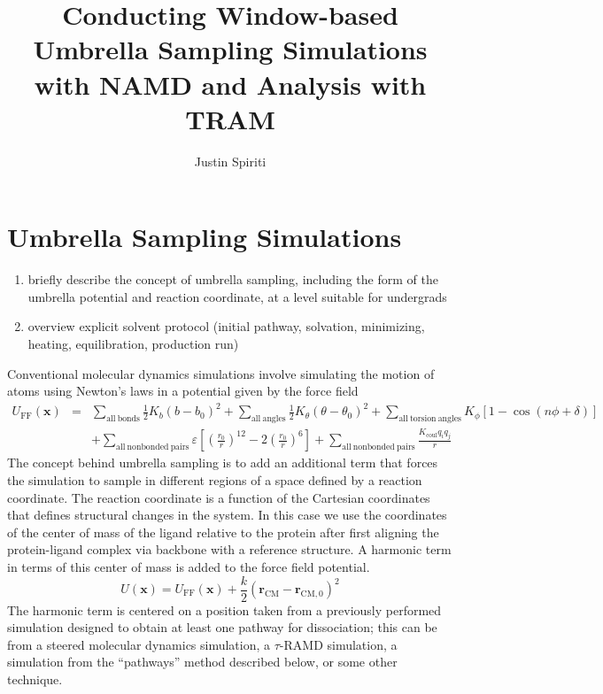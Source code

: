 \documentclass{article}      %
\title{Conducting Window-based Umbrella Sampling Simulations with NAMD and Analysis with TRAM}  %
\author{Justin Spiriti}      %
\begin{document}
\setlength{\textwidth}{6.5in}
\setlength{\textheight}{9in}
\setlength{\hoffset}{-1in}
\setlength{\voffset}{-1in}
\maketitle                   %



\section{Umbrella Sampling Simulations}

\begin{enumerate}
\item briefly describe the concept of umbrella sampling, including the form of the umbrella potential and reaction coordinate, at a level suitable for undergrads

\item overview explicit solvent protocol (initial pathway, solvation, minimizing, heating, equilibration, production run)
\end{enumerate}

Conventional molecular dynamics simulations involve simulating the motion of atoms using Newton's laws in a potential given by the force field
\begin{eqnarray}
U_\mathrm{FF}(\mathbf{x}) &=& \sum_\mathrm{all\ bonds} \frac{1}{2} K_b\left(b-b_0\right)^2  + \sum_\mathrm{all\  angles} \frac{1}{2} K_\theta\left(\theta-\theta_0\right)^2 + \sum_\mathrm{all\ torsion\ angles} K_\phi\left[1-\cos\left(n\phi+\delta\right)\right] \nonumber \\
& &  +  \sum_\mathrm{all\ nonbonded\ pairs} \varepsilon \left[\left(\frac{r_0}{r}\right)^{12} - 2 \left(\frac{r_0}{r}\right)^6 \right] +  \sum_\mathrm{all\ nonbonded\ pairs} \frac{K_\mathrm{coul} q_i q_j}{r}
\end{eqnarray} 
The concept behind umbrella sampling is to add an additional term that forces the simulation to sample in different regions of a space defined by a reaction coordinate.  The reaction coordinate is a function of the Cartesian coordinates that defines structural changes in the system.  In this case we use the coordinates of the center of mass of the ligand relative to the protein after first aligning the protein-ligand complex via backbone with a reference structure.   A harmonic term in terms of this center of mass is added to the force field potential.
\begin{equation}
U(\mathbf{x}) = U_\mathrm{FF}(\mathbf{x}) + \frac{k}{2}\left(\mathbf{r}_\mathrm{CM}-\mathbf{r}_\mathrm{CM,0}\right)^2
\end{equation}
The harmonic term is centered on a position taken from a previously performed simulation designed to obtain at least one pathway for dissociation; this can be from a steered molecular dynamics simulation, a $\tau$-RAMD simulation, a simulation from the ``pathways'' method described below, or some other technique.  
\end{document}
